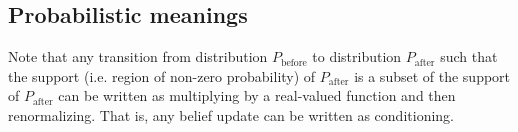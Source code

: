 \documentclass[12pt]{article}
\begin{document}
\subsection{Probabilistic meanings}

Note that any transition from distribution $P_{\text{before}}$ to distribution $P_{\text{after}}$ such that the support (i.e. region of non-zero probability) of $P_{\text{after}}$ is a subset of the support of $P_{\text{after}}$ can be written as multiplying by a real-valued function and then renormalizing. That is, any belief update can be written as conditioning.



%
%
\end{document}
